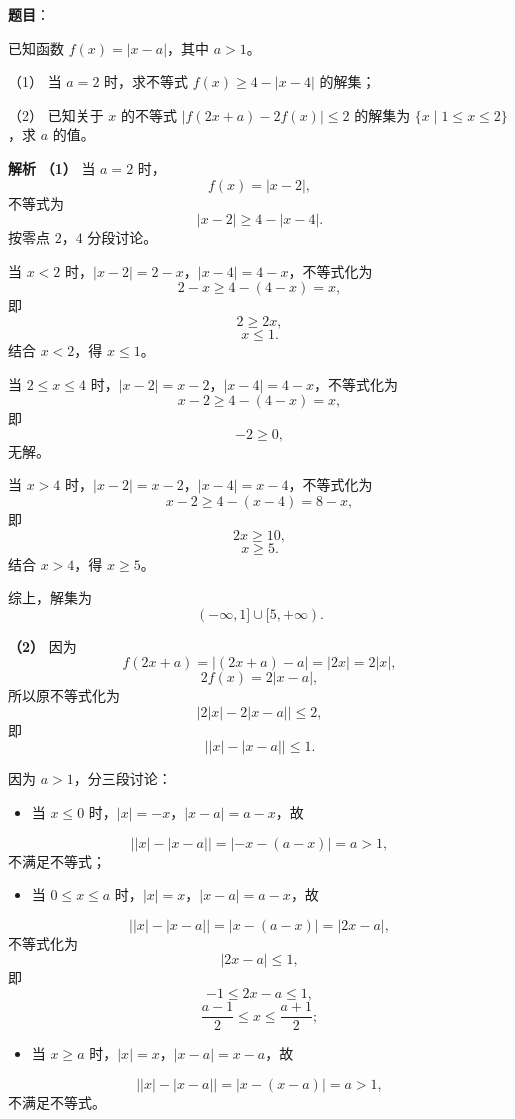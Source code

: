 \begin{answer}

\textbf{题目}：

已知函数 $f(x)=|x-a|$，其中 $a>1$。

（1） 当 $a=2$ 时，求不等式 $f(x)\geqslant4-|x-4|$ 的解集；

（2） 已知关于 $x$ 的不等式 $|f(2x+a)-2f(x)|\leqslant2$ 的解集为 $\{x\mid1\leqslant x\leqslant2\}$，求 $a$ 的值。

\textbf{解析}
\textbf{（1）} 当 $a=2$ 时，
\nopagebreak[4]
\[f(x)=|x-2|,\]
不等式为
\nopagebreak[4]
\[|x-2|\geqslant4-|x-4|.\]
按零点 $2$，$4$ 分段讨论。

当 $x<2$ 时，$|x-2|=2-x$，$|x-4|=4-x$，不等式化为
\nopagebreak[4]
\[2-x\geqslant4-(4-x)=x,\]
即
\nopagebreak[4]
\[2\geqslant2x,\]
\nopagebreak[4]
\[x\leqslant1.\]
结合 $x<2$，得 $x\leqslant1$。

当 $2\leqslant x\leqslant4$ 时，$|x-2|=x-2$，$|x-4|=4-x$，不等式化为
\nopagebreak[4]
\[x-2\geqslant4-(4-x)=x,\]
即
\nopagebreak[4]
\[-2\geqslant0,\]
无解。

当 $x>4$ 时，$|x-2|=x-2$，$|x-4|=x-4$，不等式化为
\nopagebreak[4]
\[x-2\geqslant4-(x-4)=8-x,\]
即
\nopagebreak[4]
\[2x\geqslant10,\]
\nopagebreak[4]
\[x\geqslant5.\]
结合 $x>4$，得 $x\geqslant5$。

综上，解集为
\nopagebreak[4]
\[(-\infty,1]\cup[5,+\infty).\]

\textbf{（2）} 因为
\nopagebreak[4]
\[f(2x+a)=|(2x+a)-a|=|2x|=2|x|,\]
\nopagebreak[4]
\[2f(x)=2|x-a|,\]
所以原不等式化为
\nopagebreak[4]
\[\bigl|2|x|-2|x-a|\bigr|\leqslant2,\]
即
\nopagebreak[4]
\[\bigl||x|-|x-a|\bigr|\leqslant1.\]

因为 $a>1$，分三段讨论：

\begin{itemize}
\item 当 $x\leqslant0$ 时，$|x|=-x$，$|x-a|=a-x$，故
\end{itemize}
\nopagebreak[4]
\[\bigl||x|-|x-a|\bigr|=|-x-(a-x)|=a>1,\]
不满足不等式；
\begin{itemize}
\item 当 $0\leqslant x\leqslant a$ 时，$|x|=x$，$|x-a|=a-x$，故
\end{itemize}
\nopagebreak[4]
\[\bigl||x|-|x-a|\bigr|=|x-(a-x)|=|2x-a|,\]
不等式化为
\nopagebreak[4]
\[|2x-a|\leqslant1,\]
即
\nopagebreak[4]
\[-1\leqslant2x-a\leqslant1,\]
\nopagebreak[4]
\[\frac{a-1}2\leqslant x\leqslant\frac{a+1}2;\]
\begin{itemize}
\item 当 $x\geqslant a$ 时，$|x|=x$，$|x-a|=x-a$，故
\end{itemize}
\nopagebreak[4]
\[\bigl||x|-|x-a|\bigr|=|x-(x-a)|=a>1,\]
不满足不等式。


\end{answer}
